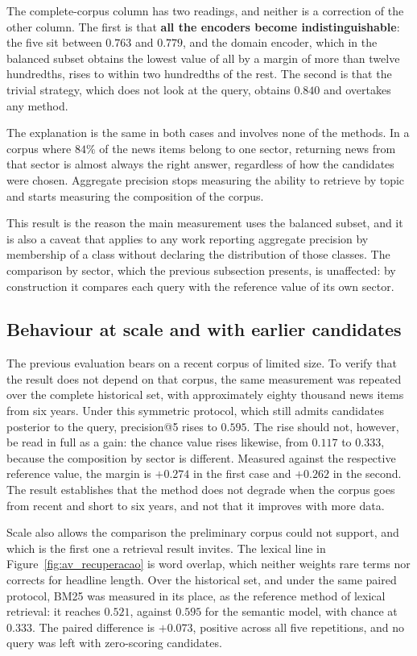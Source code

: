 The complete-corpus column has two readings, and neither is a correction of the other column. The
first is that \textbf{all the encoders become indistinguishable}: the five sit between $0.763$ and
$0.779$, and the domain encoder, which in the balanced subset obtains the lowest value of all by a
margin of more than twelve hundredths, rises to within two hundredths of the rest. The second is
that the trivial strategy, which does not look at the query, obtains $0.840$ and overtakes any
method.

The explanation is the same in both cases and involves none of the methods. In a corpus where
$84\%$ of the news items belong to one sector, returning news from that sector is almost always
the right answer, regardless of how the candidates were chosen. Aggregate precision stops
measuring the ability to retrieve by topic and starts measuring the composition of the corpus.

This result is the reason the main measurement uses the balanced subset, and it is also a caveat
that applies to any work reporting aggregate precision by membership of a class without declaring
the distribution of those classes. The comparison by sector, which the previous subsection
presents, is unaffected: by construction it compares each query with the reference value of its
own sector.

\subsection{Behaviour at scale and with earlier candidates}

The previous evaluation bears on a recent corpus of limited size. To verify that the result does
not depend on that corpus, the same measurement was repeated over the complete historical set, with
approximately eighty thousand news items from six years. Under this symmetric protocol, which still
admits candidates posterior to the query, precision@5 rises to $0.595$. The rise should not,
however, be read in full as a gain: the chance value rises likewise, from $0.117$ to $0.333$,
because the composition by sector is different. Measured against the respective reference value,
the margin is $+0.274$ in the first case and $+0.262$ in the second. The result establishes that the
method does not degrade when the corpus goes from recent and short to six years, and not that it
improves with more data.

Scale also allows the comparison the preliminary corpus could not support, and which is the first
one a retrieval result invites. The lexical line in Figure~\ref{fig:av_recuperacao} is word overlap,
which neither weights rare terms nor corrects for headline length. Over the historical set, and
under the same paired protocol, BM25 \autocite{robertson2009bm25} was measured in its place, as the
reference method of lexical retrieval: it reaches $0.521$, against $0.595$ for the semantic model,
with chance at $0.333$. The paired difference is $+0.073$, positive across all five repetitions, and
no query was left with zero-scoring candidates.

